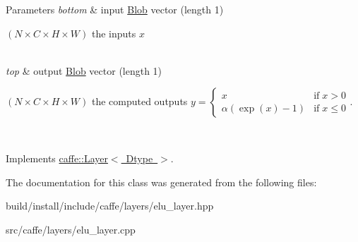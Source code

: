 \begin{DoxyParams}{Parameters}
{\em bottom} & input \mbox{\hyperlink{classcaffe_1_1_blob}{Blob}} vector (length 1)
\begin{DoxyEnumerate}
\item $ (N \times C \times H \times W) $ the inputs $ x $ 
\end{DoxyEnumerate}\\
\hline
{\em top} & output \mbox{\hyperlink{classcaffe_1_1_blob}{Blob}} vector (length 1)
\begin{DoxyEnumerate}
\item $ (N \times C \times H \times W) $ the computed outputs $ y = \left\{ \begin{array}{lr} x & \mathrm{if} \; x > 0 \\ \alpha (\exp(x)-1) & \mathrm{if} \; x \le 0 \end{array} \right. $. 
\end{DoxyEnumerate}\\
\hline
\end{DoxyParams}


Implements \mbox{\hyperlink{classcaffe_1_1_layer_a576ac6a60b1e99fe383831f52a6cea77}{caffe\+::\+Layer$<$ Dtype $>$}}.



The documentation for this class was generated from the following files\+:\begin{DoxyCompactItemize}
\item 
build/install/include/caffe/layers/elu\+\_\+layer.\+hpp\item 
src/caffe/layers/elu\+\_\+layer.\+cpp\end{DoxyCompactItemize}
